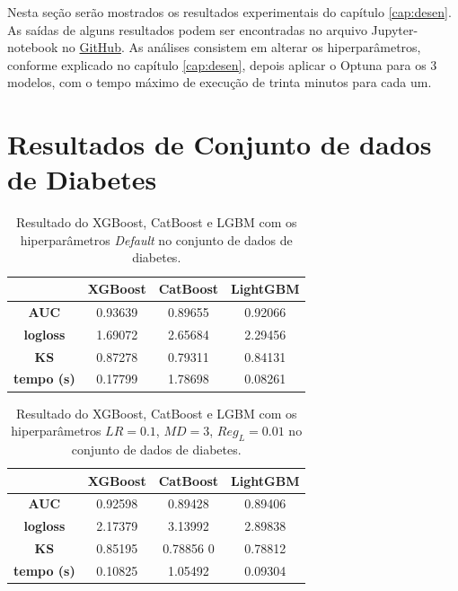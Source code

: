 \label{cap:exper}
Nesta seção serão mostrados os resultados experimentais do capítulo \ref{cap:desen}. As saídas de alguns resultados podem ser encontradas no arquivo Jupyter-notebook no \href{https://github.com/joaomh/study_boosting_optuna_USP_undergraduate_thesis}{GitHub}. As análises consistem em alterar os hiperparâmetros, conforme explicado no capítulo \ref{cap:desen}, depois aplicar o Optuna para os 3 modelos, com o tempo máximo de execução de trinta minutos para cada um.
\section{Resultados de Conjunto de dados de Diabetes}
\begin{table}[H]
\centering
\begin{tabular}{|c|c|c|c|}
\hline
	& \textbf{XGBoost} &\textbf{CatBoost} & \textbf{LightGBM} \\
\hline
\textbf{AUC}	&0.93639	& 0.89655	& 0.92066 \\
\hline
\textbf{logloss}	& 1.69072 & 2.65684	& 2.29456 \\
\hline
\textbf{KS}	& 0.87278	& 0.79311	& 0.84131 \\
\hline
\textbf{tempo (s)}	& 0.17799 &	 1.78698 &	0.08261 \\
\hline
\end{tabular}
\caption{Resultado do XGBoost, CatBoost e LGBM com os hiperparâmetros \textit{Default} no conjunto de dados de diabetes.}\label{res:dia:1}
\end{table}

\begin{table}[H]
\label{res:dia:2}
\centering
\begin{tabular}{|c|c|c|c|}
\hline
	& \textbf{XGBoost} &\textbf{CatBoost} & \textbf{LightGBM} \\
\hline
\textbf{AUC}	& 0.92598	& 0.89428	& 0.89406\\
\hline
\textbf{logloss}	& 2.17379	& 3.13992	& 2.89838\\
\hline
\textbf{KS}	& 0.85195	& 0.78856	0& 0.78812 \\
\hline
\textbf{tempo (s)}	& 0.10825	& 1.05492	& 0.09304 \\
\hline
\end{tabular}
\caption{Resultado do XGBoost, CatBoost e LGBM com os hiperparâmetros $LR=0.1$, $MD=3$, $Reg_L=0.01$ no conjunto de dados de diabetes.}
\end{table}

